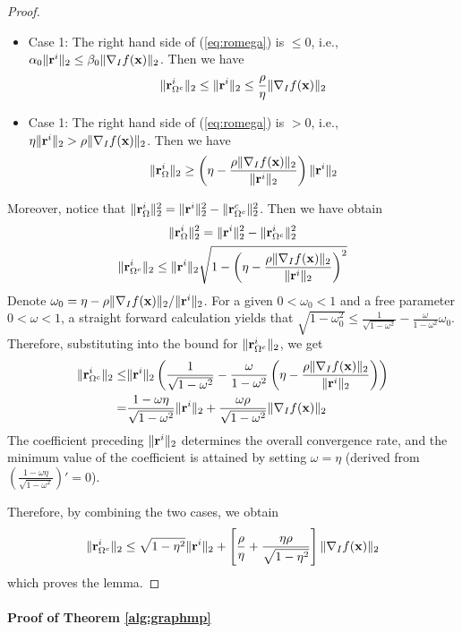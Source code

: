 \documentclass{article}
\begin{document}
\begin{proof}
\begin{itemize}
\item Case 1: The right hand side of (\ref{eq:romega}) is $\leq 0$, i.e., $\alpha_0\|{\bf r}^i\|_2\leq\beta_0\|\nabla_I f({\bf x})\|_2$. Then we have
\[
\|{\bf r}_{\Omega^c}^i\|_2\leq\|{\bf r}^i\|_2\leq\frac{\rho}{\eta}\|\nabla_I f({\bf x})\|_2
\]
\item Case 1: The right hand side of (\ref{eq:romega}) is $> 0$, i.e., $\eta\|{\bf r}^i\|_2>\rho\|\nabla_I f({\bf x})\|_2$. Then we have
\[
\|{\bf r}_{\Omega}^i\|_2\geq\left(\eta-\frac{\rho\|\nabla_I f({\bf x})\|_2}{\|{\bf r}^i\|_2} \right)\|{\bf r}^i\|_2
\]
\end{itemize}
Moreover, notice that $\|{\bf r}_{\Omega}^i\|_2^2=\|{\bf r}^i\|_2^2-\|{\bf r}_{\Omega^c}^c\|_2^2$. Then we have obtain
\begin{gather*}
\|{\bf r}_{\Omega}^i\|_2^2=\|{\bf r}^i\|_2^2-\|{\bf r}_{\Omega^c}^i\|_2^2\\
\|{\bf r}_{\Omega^c}^i\|_2\leq\|{\bf r}^i\|_2\sqrt{1-\left(\eta-\frac{\rho\|\nabla_I f({\bf x})\|_2}{\|{\bf r}^i\|_2} \right)^2}
\end{gather*}
Denote $\omega_0=\eta-\rho\|\nabla_I f({\bf x})\|_2/\|{\bf r}^i\|_2$. For a given $0<\omega_0<1$ and a free parameter $0<\omega<1$, a straight forward calculation yields that $\sqrt{1-\omega_0^2}\leq\frac{1}{\sqrt{1-\omega^2}}-\frac{\omega}{1-\omega^2}\omega_0$. Therefore, substituting into the bound for $\|{\bf r}_{\Omega^c}^i\|_2$, we get
\begin{align*}
\|{\bf r}_{\Omega^c}^i\|_2\leq&\|{\bf r}^i\|_2\left(\frac{1}{\sqrt{1-\omega^2}}-\frac{\omega}{1-\omega^2}\left(\eta-\frac{\rho\|\nabla_I f({\bf x})\|_2}{\|{\bf r}^i\|_2} \right) \right)\\
=&\frac{1-\omega\eta}{\sqrt{1-\omega^2}}\|{\bf r}^i\|_2+\frac{\omega\rho}{\sqrt{1-\omega^2}}\|\nabla_I f({\bf x})\|_2
\end{align*}
The coefficient preceding $\|{\bf r}^i\|_2$ determines the overall convergence rate, and the minimum value of the coefficient is attained by setting $\omega=\eta$ (derived from $(\frac{1-\omega\eta}{\sqrt{1-\omega^2}})'=0$).

Therefore, by combining the two cases, we obtain
\[
\|{\bf r}_{\Omega^c}^i\|_2\leq\sqrt{1-\eta^2}\|{\bf r}^i\|_2+\left[\frac{\rho}{\eta}+\frac{\eta\rho}{\sqrt{1-\eta^2}} \right]\|\nabla_I f({\bf x})\|_2
\]
which proves the lemma.
\end{proof}

\paragraph{Proof of Theorem \ref{alg:graphmp}}
\end{document}
